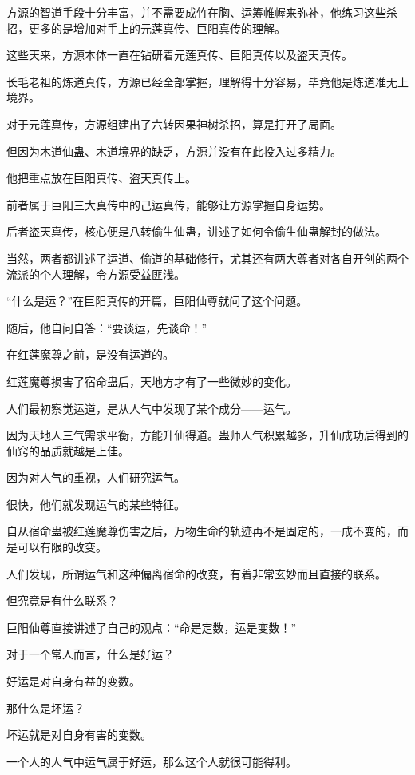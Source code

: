 
\begin{this_body}

方源的智道手段十分丰富，并不需要成竹在胸、运筹帷幄来弥补，他练习这些杀招，更多的是增加对手上的元莲真传、巨阳真传的理解。

这些天来，方源本体一直在钻研着元莲真传、巨阳真传以及盗天真传。

长毛老祖的炼道真传，方源已经全部掌握，理解得十分容易，毕竟他是炼道准无上境界。

对于元莲真传，方源组建出了六转因果神树杀招，算是打开了局面。

但因为木道仙蛊、木道境界的缺乏，方源并没有在此投入过多精力。

他把重点放在巨阳真传、盗天真传上。

前者属于巨阳三大真传中的己运真传，能够让方源掌握自身运势。

后者盗天真传，核心便是八转偷生仙蛊，讲述了如何令偷生仙蛊解封的做法。

当然，两者都讲述了运道、偷道的基础修行，尤其还有两大尊者对各自开创的两个流派的个人理解，令方源受益匪浅。

“什么是运？”在巨阳真传的开篇，巨阳仙尊就问了这个问题。

随后，他自问自答：“要谈运，先谈命！”

在红莲魔尊之前，是没有运道的。

红莲魔尊损害了宿命蛊后，天地方才有了一些微妙的变化。

人们最初察觉运道，是从人气中发现了某个成分——运气。

因为天地人三气需求平衡，方能升仙得道。蛊师人气积累越多，升仙成功后得到的仙窍的品质就越是上佳。

因为对人气的重视，人们研究运气。

很快，他们就发现运气的某些特征。

自从宿命蛊被红莲魔尊伤害之后，万物生命的轨迹再不是固定的，一成不变的，而是可以有限的改变。

人们发现，所谓运气和这种偏离宿命的改变，有着非常玄妙而且直接的联系。

但究竟是有什么联系？

巨阳仙尊直接讲述了自己的观点：“命是定数，运是变数！”

对于一个常人而言，什么是好运？

好运是对自身有益的变数。

那什么是坏运？

坏运就是对自身有害的变数。

一个人的人气中运气属于好运，那么这个人就很可能得利。


\end{this_body}
